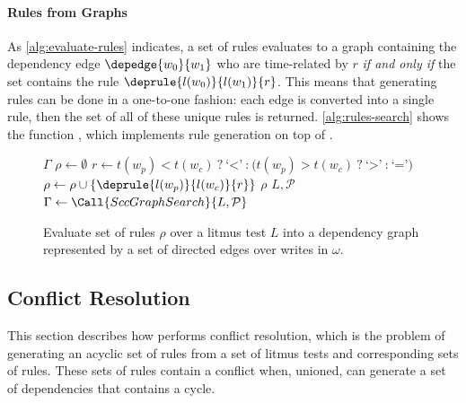 \paragraph{Rules from Graphs}
As \autoref{alg:evaluate-rules} indicates, a set of rules evaluates to a graph
containing the dependency edge $\depedge{w_0}{w_1}$ who are time-related by $r$
\textit{if and only if} the set contains the rule $\deprule{l(w_0)}{l(w_1)}{r}$.
This means that generating rules can be done in a one-to-one fashion: each
edge is converted into a single rule, then the set of all of these unique rules
is returned. \autoref{alg:rules-search} shows the function , which
implements rule generation on top of \sccsearch.

\begin{figure}[h]
\begin{algorithmic}[1]
    {$\Gamma$} 
    \State $\rho \gets \emptyset$
      \State $r \gets t(w_p)<t(w_c)\ \texttt{?}\ \text{`<'}\ \texttt{:}\ 
              \big(t(w_p)>t(w_c)\ \texttt{?}\ \text{`>'}\ \texttt{:}\ \text{`='} \big)$
      \State $\rho \gets \rho \cup \{\deprule{l(w_p)}{l(w_c)}{r}\}$
    \EndFor
    \State \Return $\rho$
  \EndFunction
    {$L, \mathcal{P}$} 
    \State $\Gamma \gets \Call{SccGraphSearch}{L, \mathcal{P}}$
    \State \Return {}
  \EndFunction
\end{algorithmic}
\caption{Evaluate set of rules $\rho$ over a litmus test $L$ into a dependency graph
represented by a set of directed edges over writes in $\omega$.\tighten}
\label{alg:rules-search}
\end{figure}


\subsection{Conflict Resolution}
\label{l:resolvecons}
This section describes how \depsynth performs conflict resolution,
which is the problem of generating an acyclic set of rules from a set of
litmus tests and corresponding sets of rules. These sets of rules contain
a conflict when, unioned, can generate a set of dependencies that contains
a cycle.

